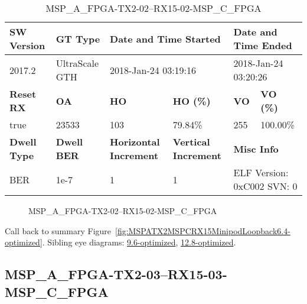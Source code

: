 \begin{table}[h]
\centering
\caption{MSP\_A\_FPGA-TX2-02--RX15-02-MSP\_C\_FPGA}
\label{tab:MSPAFPGATX202RX1502MSPCFPGA6.4-optimized}
\begin{tabular}{@{}|l|l|l|l|l|l|@{}}
\toprule
\textbf{SW Version}                & \textbf{GT Type}   & \multicolumn{2}{l|}{\textbf{Date and Time Started}}            & \multicolumn{2}{l|}{\textbf{Date and Time Ended}}        \\ \midrule
2017.2                       & UltraScale GTH          & \multicolumn{2}{l|}{2018-Jan-24 03:19:16}                   & \multicolumn{2}{l|}{2018-Jan-24 03:20:26}               \\ \midrule
\textbf{Reset RX}                  & \textbf{OA} & \textbf{HO}   & \textbf{HO (\%)} & \textbf{VO} & \textbf{VO (\%)} \\ \midrule
true & 23533        & 103          & 79.84\%        & 255        & 100.00\%       \\ \midrule
\textbf{Dwell Type}                & \textbf{Dwell BER} & \textbf{Horizontal Increment} & \textbf{Vertical Increment}    & \multicolumn{2}{l|}{\textbf{Misc Info}}                  \\ \midrule
BER                            & 1e-7        & 1        & 1           & \multicolumn{2}{l|}{ELF Version: 0xC002 SVN: 0}                         \\ \bottomrule
\end{tabular}
\end{table}

\begin{figure}[h]
\caption{MSP\_A\_FPGA-TX2-02--RX15-02-MSP\_C\_FPGA} \label{fig:MSPAFPGATX202RX1502MSPCFPGA6.4-optimized}
\end{figure}

Call back to summary Figure~\ref{fig:MSPATX2MSPCRX15MinipodLoopback6.4-optimized}.
Sibling eye diagrams: \hyperref[sec:MSPAFPGATX202RX1502MSPCFPGA9.6-optimized]{9.6-optimized}, \hyperref[sec:MSPAFPGATX202RX1502MSPCFPGA12.8-optimized]{12.8-optimized}.

\clearpage
\newpage


\subsection{MSP\_A\_FPGA-TX2-03--RX15-03-MSP\_C\_FPGA}\label{sec:MSPAFPGATX203RX1503MSPCFPGA6.4-optimized}

